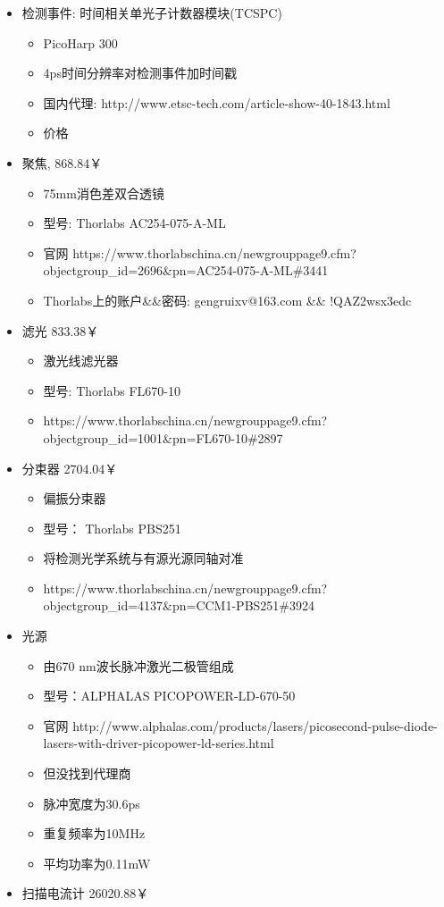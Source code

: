 \documentclass[11pt]{article}
\providecommand{\tightlist}{%
      \setlength{\itemsep}{0pt}\setlength{\parskip}{0pt}}
\begin{document}
\begin{itemize}
\tightlist
\item
  检测事件: 时间相关单光子计数器模块(TCSPC)

  \begin{itemize}
  \tightlist
  \item
    PicoHarp 300
  \item
    4ps时间分辨率对检测事件加时间戳
  \item
    国内代理: http://www.etsc-tech.com/article-show-40-1843.html
  \item
    价格
  \end{itemize}
\item
  聚焦, 868.84￥

  \begin{itemize}
  \tightlist
  \item
    75mm消色差双合透镜
  \item
    型号: Thorlabs AC254-075-A-ML
  \item
    官网
    https://www.thorlabschina.cn/newgrouppage9.cfm?objectgroup\_id=2696\&pn=AC254-075-A-ML\#3441
  \item
    Thorlabs上的账户\&\&密码: gengruixv@163.com \&\& !QAZ2wsx3edc
  \end{itemize}
\item
  滤光 833.38￥

  \begin{itemize}
  \tightlist
  \item
    激光线滤光器
  \item
    型号: Thorlabs FL670-10
  \item
    https://www.thorlabschina.cn/newgrouppage9.cfm?objectgroup\_id=1001\&pn=FL670-10\#2897
  \end{itemize}
\item
  分束器 2704.04￥

  \begin{itemize}
  \tightlist
  \item
    偏振分束器
  \item
    型号： Thorlabs PBS251
  \item
    将检测光学系统与有源光源同轴对准
  \item
    https://www.thorlabschina.cn/newgrouppage9.cfm?objectgroup\_id=4137\&pn=CCM1-PBS251\#3924
  \end{itemize}
\item
  光源

  \begin{itemize}
  \tightlist
  \item
    由670 nm波长脉冲激光二极管组成
  \item
    型号：ALPHALAS PICOPOWER-LD-670-50
  \item
    官网
    http://www.alphalas.com/products/lasers/picosecond-pulse-diode-lasers-with-driver-picopower-ld-series.html
  \item
    但没找到代理商
  \item
    脉冲宽度为30.6ps
  \item
    重复频率为10MHz
  \item
    平均功率为0.11mW
  \end{itemize}
\item
  扫描电流计 26020.88￥


\end{itemize}
\end{document}
